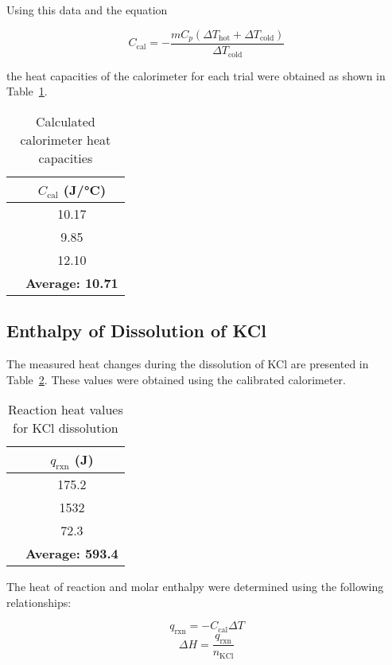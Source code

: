 \documentclass[11pt,letterpaper]{article}
\begin{document}
Using this data and the equation

\begin{equation}
C_{\text{cal}} = -\frac{mC_p(\Delta T_{\text{hot}}+\Delta T_{\text{cold}})}{\Delta T_{\text{cold}}}
\label{eq:calorimeter}
\end{equation}

\noindent the heat capacities of the calorimeter for each trial were obtained as shown in Table~\ref{tab:calheat}.

\begin{table}[h]
\centering
\caption{Calculated calorimeter heat capacities}
\label{tab:calheat}
\begin{tabular}{lc}
\hline
& $C_{\text{cal}}$ (J/°C) \\
\hline
& 10.17 \\
& 9.85 \\
& 12.10 \\
\hline
& \textbf{Average: 10.71} \\
\hline
\end{tabular}
\end{table}

\subsection*{Enthalpy of Dissolution of KCl}

The measured heat changes during the dissolution of KCl are presented in Table~\ref{tab:dissolution}. These values were obtained using the calibrated calorimeter.

\begin{table}[h]
\centering
\caption{Reaction heat values for KCl dissolution}
\label{tab:dissolution}
\begin{tabular}{lc}
\hline
& $q_{\text{rxn}}$ (J) \\
\hline
& 175.2 \\
& 1532 \\
& 72.3 \\
\hline
& \textbf{Average: 593.4} \\
\hline
\end{tabular}
\end{table}

The heat of reaction and molar enthalpy were determined using the following relationships:

\begin{equation}
q_{\text{rxn}} = -C_{\text{cal}}\Delta T
\label{eq:rxn}
\end{equation}
\begin{equation}
\Delta H = \frac{q_{\text{rxn}}}{n_{\text{KCl}}}
\label{eq:enthalpy}
\end{equation}
\end{document}

